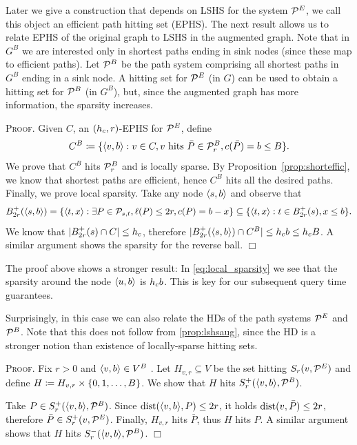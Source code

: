 \documentclass[opre,nonblindrev]{informs3} %
\renewenvironment{proof}[1][\textsc{Proof.}]{#1 }{\hfill $\Box$}
\begin{document}
Later we give a construction that depends on LSHS for the system $\mathcal{P}^E$, we call this object an efficient path hitting set (EPHS).
The next result allows us to relate EPHS of the original graph to LSHS in the augmented graph.
Note that in $G^B$ we are interested only in shortest paths ending in sink nodes (since these map to efficient paths). 
Let $\mathcal{P}^B$ be the path system comprising all shortest paths in $G^B$ ending in a sink node.
A hitting set for $\mathcal{P}^E$ (in $G$) can be used to obtain a hitting set for $\mathcal{P}^B$ (in $G^B$), but, since the augmented graph has more information, the sparsity increases.
 
\begin{proof}
Given $C$, an $(h_c,r)$-EPHS for $\mathcal{P}^E$, define
\begin{equation}\label{eq:hitset}
C^B\coloneqq \{\langle v,b\rangle: v\in C, v \text{ hits }\bar P\in\mathcal{P}^B_r, c(\bar P)=b\leq B \}.
\end{equation}
We prove that $C^B$ hits $\mathcal{P}^B_r$ and is locally sparse. 
By Proposition~\ref{prop:shorteffic}, we know that shortest paths are efficient, hence $C^B$ hits all the desired paths.
Finally, we prove local sparsity.
Take any node $\langle s,b\rangle$ and observe that
\begin{equation}\label{eq:local_sparsity}
B^+_{2r}(\langle s,b\rangle) = \{\langle t,x\rangle: \exists P\in\mathcal{P}_{s,t}, \ell(P)\leq 2r, c(P)=b-x\} 
\subseteq \{\langle t,x\rangle: t\in B^+_{2r}(s), x\leq b\} . 
\end{equation}
We know that $\lvert B^+_{2r}(s)\cap C\rvert\leq h_c$, therefore $\lvert B^+_{2r}(\langle s,b\rangle)\cap C^B\rvert\leq h_c b\leq h_c B$.
A similar argument shows the sparsity for the reverse ball.
\end{proof}

The proof above shows a stronger result:
In \cref{eq:local_sparsity} we see that the sparsity around the node $\langle u,b\rangle$ is $h_c b$.
This is key for our subsequent query time guarantees.

Surprisingly, in this case we can also relate the HDs of the path systems $\mathcal{P}^E$ and $\mathcal{P}^B$.
Note that this does not follow from \cref{prop:lshsaug}, since the HD is a stronger notion than existence of locally-sparse hitting sets.
\begin{proof}
Fix $r>0$ and $\langle v,b\rangle\in V^B$ .
Let $H_{v,r}\subseteq V$ be the set hitting $S_r(v,\mathcal{P}^E)$ and define $H\coloneqq H_{v,r}\times\{0,1,\ldots,B\}$.
We show that $H$ hits $S^+_r(\langle v,b\rangle,\mathcal{P}^B)$.

Take $P\in S^+_r(\langle v,b\rangle,\mathcal{P}^B)$.
Since $\mbox{dist}(\langle v,b\rangle,P)\leq 2r$, it holds $\mbox{dist}(v,\bar P)\leq 2r$, therefore $\bar P\in S^+_r(v,\mathcal{P}^E)$.
Finally, $H_{v,r}$ hits $\bar P$, thus $H$ hits $P$.
A similar argument shows that $H$ hits $S^-_r(\langle v,b\rangle,\mathcal{P}^B)$.
\end{proof}
\end{document}
